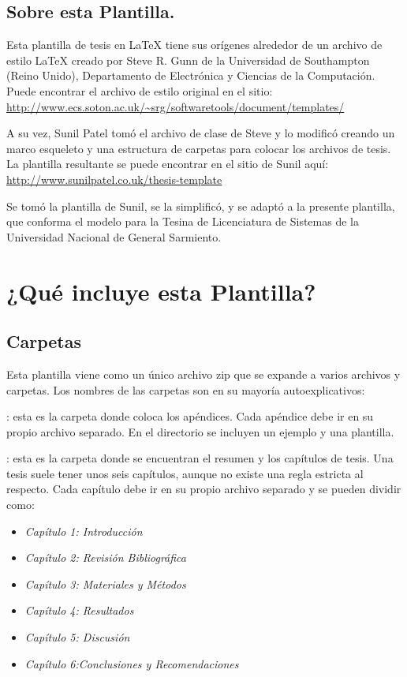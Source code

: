 \subsection{Sobre esta Plantilla.}

Esta plantilla de tesis en \LaTeX{} tiene sus orígenes alrededor de un archivo de estilo \LaTeX{} creado por Steve R.  Gunn de la Universidad de Southampton (Reino Unido), Departamento de Electrónica y Ciencias de la Computación. Puede encontrar el archivo de estilo original en el sitio:
\url{http://www.ecs.soton.ac.uk/~srg/softwaretools/document/templates/}

A su vez, Sunil Patel tomó el archivo de clase  de Steve y lo modificó creando un marco esqueleto y una estructura de carpetas para colocar los archivos de tesis. La plantilla resultante se puede encontrar en el sitio de Sunil aquí: \url{http://www.sunilpatel.co.uk/thesis-template}

Se tomó la plantilla de Sunil, se la simplificó, y se adaptó a la presente plantilla, que conforma el modelo para la Tesina de Licenciatura de Sistemas de la Universidad Nacional de General Sarmiento. 

\section{¿Qué incluye esta Plantilla?}

\subsection{Carpetas}
Esta plantilla viene como un único archivo zip que se expande a varios archivos y carpetas. Los nombres de las carpetas son en su mayoría autoexplicativos:

: esta es la carpeta donde coloca los apéndices. Cada apéndice debe ir en su propio archivo  separado. En el directorio se incluyen un ejemplo y una plantilla.

: esta es la carpeta donde se encuentran el resumen y los capítulos de tesis. Una tesis suele tener unos seis capítulos, aunque no existe una regla estricta al respecto. Cada capítulo debe ir en su propio archivo  separado y se pueden dividir como:

\begin{itemize}
	\item \textit{Capítulo 1: Introducción}
	\item \textit{Capítulo 2: Revisión Bibliográfica}
	\item \textit{Capítulo 3: Materiales y Métodos}
	\item \textit{Capítulo 4: Resultados}
	\item \textit{Capítulo 5: Discusión}
	\item \textit{Capítulo 6:Conclusiones y  Recomendaciones}
\end{itemize}


